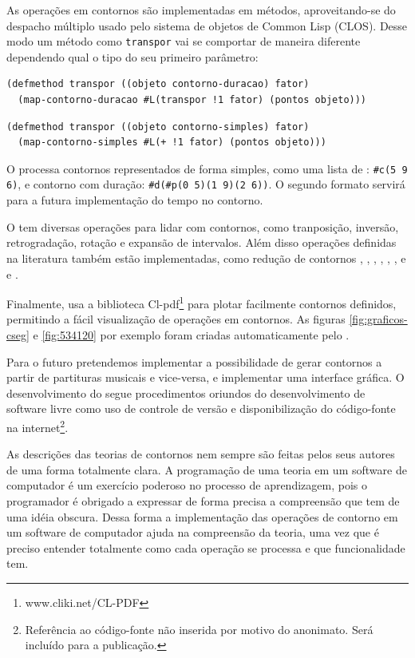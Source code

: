 As operações em contornos são implementadas em métodos,
aproveitando-se do despacho múltiplo usado pelo sistema de objetos de
Common Lisp (CLOS). Desse modo um método como \texttt{transpor} vai se
comportar de maneira diferente dependendo qual o tipo do seu primeiro
parâmetro:

\begin{verbatim}
(defmethod transpor ((objeto contorno-duracao) fator)
  (map-contorno-duracao #L(transpor !1 fator) (pontos objeto)))
\end{verbatim}

\begin{verbatim}
(defmethod transpor ((objeto contorno-simples) fator)
  (map-contorno-simples #L(+ !1 fator) (pontos objeto)))
\end{verbatim}

O \goiaba{} processa contornos representados de forma simples, como
uma lista de : \verb!#c(5 9 6)!, e contorno com
duração: \verb!#d(#p(0 5)(1 9)(2 6))!. O segundo formato servirá para
a futura implementação do tempo no contorno.

O \goiaba{} tem diversas operações para lidar com contornos, como
tranposição, inversão, retrogradação, rotação e expansão de
intervalos. Além disso operações definidas na literatura também estão
implementadas, como redução de contornos \cite{adams76:melodic},
, , , , ,
 e  \cite{friedmann85:methodology} e
 \cite{morris93:directions}.

Finalmente, \goiaba{} usa a biblioteca
Cl-pdf\footnote{www.cliki.net/CL-PDF} para plotar facilmente contornos
definidos, permitindo a fácil visualização de operações em
contornos. As figuras \ref{fig:graficos-cseg} e \ref{fig:534120} por
exemplo foram criadas automaticamente pelo \goiaba{}.

Para o futuro pretendemos implementar a possibilidade de gerar
contornos a partir de partituras musicais e vice-versa, e implementar
uma interface gráfica. O desenvolvimento do \goiaba{} segue
procedimentos oriundos do desenvolvimento de software livre como uso
de controle de versão e disponibilização do código-fonte na
internet\footnote{Referência ao código-fonte não inserida por motivo
  do anonimato. Será incluído para a publicação.}.

As descrições das teorias de contornos nem sempre são feitas pelos
seus autores de uma forma totalmente clara. A programação de uma
teoria em um software de computador é um exercício poderoso no
processo de aprendizagem, pois o programador é obrigado a expressar de
forma precisa a compreensão que tem de uma idéia obscura. Dessa forma
a implementação das operações de contorno em um software de computador
ajuda na compreensão da teoria, uma vez que é preciso entender
totalmente como cada operação se processa e que funcionalidade tem.

